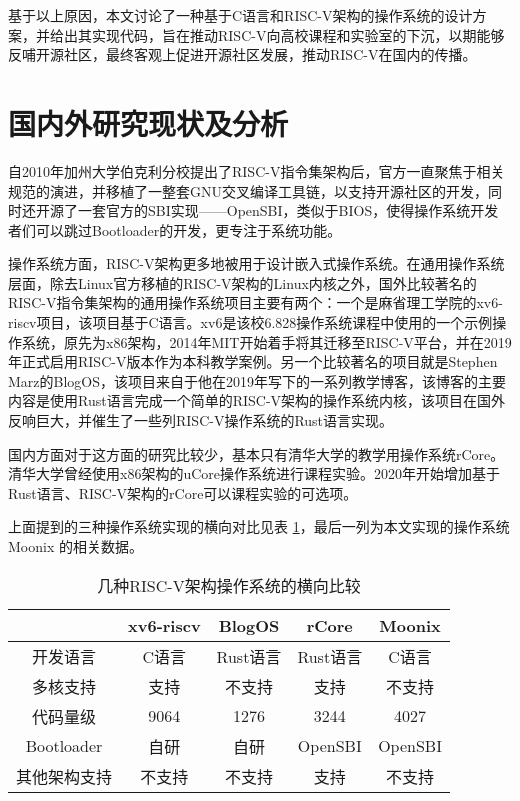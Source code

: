 基于以上原因，本文讨论了一种基于C语言和RISC-V架构的操作系统的设计方案，并给出其实现代码，旨在推动RISC-V向高校课程和实验室的下沉，以期能够反哺开源社区，最终客观上促进开源社区发展，推动RISC-V在国内的传播。

\section{国内外研究现状及分析}

自2010年加州大学伯克利分校提出了RISC-V指令集架构后，官方一直聚焦于相关规范的演进，并移植了一整套GNU交叉编译工具链，以支持开源社区的开发，同时还开源了一套官方的SBI实现——OpenSBI，类似于BIOS，使得操作系统开发者们可以跳过Bootloader的开发，更专注于系统功能。

操作系统方面，RISC-V架构更多地被用于设计嵌入式操作系统\cite{6481909}\cite{7496153}。在通用操作系统层面，除去Linux官方移植的RISC-V架构的Linux内核之外\cite{8965559}，国外比较著名的RISC-V指令集架构的通用操作系统项目主要有两个：一个是麻省理工学院的xv6-riscv项目，该项目基于C语言。xv6是该校6.828操作系统课程中使用的一个示例操作系统，原先为x86架构，2014年MIT开始着手将其迁移至RISC-V平台，并在2019年正式启用RISC-V版本作为本科教学案例。另一个比较著名的项目就是Stephen Marz的BlogOS，该项目来自于他在2019年写下的一系列教学博客，该博客的主要内容是使用Rust语言完成一个简单的RISC-V架构的操作系统内核，该项目在国外反响巨大，并催生了一些列RISC-V操作系统的Rust语言实现。

国内方面对于这方面的研究比较少，基本只有清华大学的教学用操作系统rCore。清华大学曾经使用x86架构的uCore操作系统进行课程实验。2020年开始增加基于Rust语言、RISC-V架构的rCore可以课程实验的可选项。

上面提到的三种操作系统实现的横向对比见表 \ref{tab:os-compare}，最后一列为本文实现的操作系统 Moonix 的相关数据。

\begin{table}[h]
	\centering
	\setlength{\belowcaptionskip}{2pt}
	\caption{几种RISC-V架构操作系统的横向比较}
	\label{tab:os-compare}
	\begin{tabular}{ccccc}
		\hline
		& xv6-riscv & BlogOS & rCore & Moonix   \\ \hline
		开发语言       & C语言       & Rust语言 & Rust语言 & C语言  \\ 
		多核支持       & 支持        & 不支持    & 支持   & 不支持  \\ 
		代码量级       & 9064      & 1276   & 3244   & 4027  \\ 
		Bootloader & 自研        & 自研     & OpenSBI  & OpenSBI \\ 
		其他架构支持     & 不支持       & 不支持    & 支持    & 不支持   \\ \hline
	\end{tabular}
\end{table}

